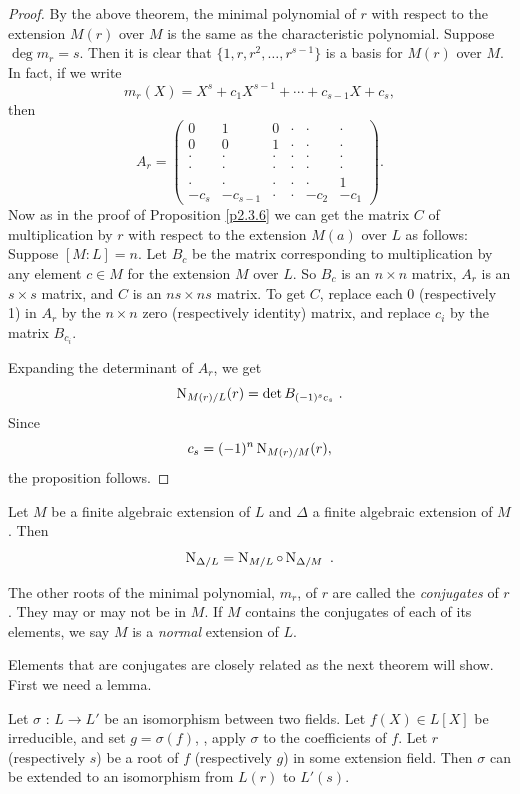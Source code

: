 \begin{proof}
By the above theorem, the minimal polynomial of $r$ with respect to the extension $M(r)$ over $M$ is the same as the characteristic polynomial. Suppose $\deg m_{r}=s$. Then it is clear that $\{1,r,r^{2},\ldots,r^{s-1}\}$ is a basis for $M(r)$ over $M$. In fact, if we write
$$
m_{r}(X)=X^{s}+c_{1}X^{s-1}+\cdots+c_{s-1}X+c_{s},
$$
then
$$A_r=\left(
\begin{array}{cccccc}
0&1&0&\cdot&\cdot&\cdot\\
0&0&1&\cdot&\cdot&\cdot\\
\cdot&\cdot&\cdot&\cdot&\cdot&\cdot\\
\cdot&\cdot&\cdot&\cdot&\cdot&\cdot\\
\cdot&\cdot&\cdot&\cdot&\cdot&1\\
-c_s&-c_{s-1}&\cdot&\cdot&-c_2&-c_1
\end{array}
\right).$$
Now as in the proof of Proposition \ref{p2.3.6} we can get the matrix $C$ of multiplication by $r$ with respect to the extension $M(a)$ over $L$ as follows: Suppose $[M:L]=n$. Let $B_{c}$ be the matrix corresponding to multiplication by any element $c\in M$ for the extension $M$ over $L$. So $B_{c}$ is an $n \times n$ matrix, $A_{r}$ is an $s \times s$ matrix, and $C$ is an $ns \times ns$ matrix. To get $C$, replace each $0$ (respectively 1) in $A_{r}$ by the $n\times n$ zero (respectively identity) matrix, and replace $c_{i}$ by the matrix $B_{c_{i}}$.

Expanding the determinant of $A_{r}$, we get
$$
\operatorname{N}_{M(r)/L}(r)=\det B_{(-1)^{s}c_{s}}\ .
$$
Since
$$
c_{s}=(-1)^{n}\operatorname{N}_{M(r)/M}(r),
$$
the proposition follows.
\end{proof}

\begin{coro}
\label{c2.5.3}
Let $M$ be a finite algebraic extension of $L$ and $\Delta$ a finite algebraic extension of $M$. Then
$$
\operatorname{N}_{\Delta/L}=\operatorname{N}_{M/L}\circ \operatorname{N}_{\Delta/M}\ .
$$
\end{coro}

The other roots of the minimal polynomial, $m_{r}$, of $r$ are called the {\it conjugates} of $r$. They may or may not be in $M$. If $M$ contains the conjugates of each of its elements, we say $M$ is a {\it normal} extension of $L$.

Elements that are conjugates are closely related as the next theorem will show. First we need a lemma.

\begin{lem}
\label{l2.5.3}
Let $\sigma$ : $L\rightarrow L'$ be an isomorphism between two fields. Let $f(X)\in L[X]$ be irreducible, and set $g=\sigma(f)$, \ie, apply $\sigma$ to the coefficients of $f$. Let $r$ (respectively $s$) be a root of $f$ (respectively $g$) in some extension field. Then $\sigma$ can be extended to an isomorphism from $L(r)$ to $L'(s)$.
\end{lem}


